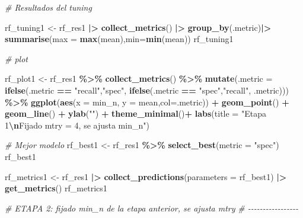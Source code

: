 \documentclass[12pt,a4paper,]{book}
\newenvironment{Shaded}{\begin{snugshade}}{\end{snugshade}}
\newcommand{\AttributeTok}[1]{\textcolor[rgb]{0.13,0.29,0.53}{#1}}
\newcommand{\CommentTok}[1]{\textcolor[rgb]{0.56,0.35,0.01}{\textit{#1}}}
\newcommand{\FunctionTok}[1]{\textcolor[rgb]{0.13,0.29,0.53}{\textbf{#1}}}
\newcommand{\NormalTok}[1]{#1}
\newcommand{\OtherTok}[1]{\textcolor[rgb]{0.56,0.35,0.01}{#1}}
\newcommand{\SpecialCharTok}[1]{\textcolor[rgb]{0.81,0.36,0.00}{\textbf{#1}}}
\newcommand{\StringTok}[1]{\textcolor[rgb]{0.31,0.60,0.02}{#1}}
\numberwithin{dummy}{section}
\theoremstyle{ocrenumbox}
\theoremstyle{blacknumex}
\theoremstyle{blacknumbox}
\theoremstyle{ocrenum}
\theoremstyle{ocrenum}
\begin{document}
\begin{Shaded}
\begin{Highlighting}[]
\CommentTok{\# Resultados del tuning}

\NormalTok{rf\_tuning1 }\OtherTok{\textless{}{-}}\NormalTok{ rf\_res1 }\SpecialCharTok{|\textgreater{}} 
  \FunctionTok{collect\_metrics}\NormalTok{() }\SpecialCharTok{|\textgreater{}} 
  \FunctionTok{group\_by}\NormalTok{(.metric)}\SpecialCharTok{|\textgreater{}} 
  \FunctionTok{summarise}\NormalTok{(}\AttributeTok{max =} \FunctionTok{max}\NormalTok{(mean),}\AttributeTok{min=}\FunctionTok{min}\NormalTok{(mean))}
\NormalTok{rf\_tuning1}

\CommentTok{\# plot}

\NormalTok{rf\_plot1 }\OtherTok{\textless{}{-}} 
\NormalTok{  rf\_res1 }\SpecialCharTok{\%\textgreater{}\%} 
  \FunctionTok{collect\_metrics}\NormalTok{() }\SpecialCharTok{\%\textgreater{}\%}  
  \FunctionTok{mutate}\NormalTok{(}\AttributeTok{.metric =} \FunctionTok{ifelse}\NormalTok{(.metric }\SpecialCharTok{==} \StringTok{"recall"}\NormalTok{,}\StringTok{"spec"}\NormalTok{,}
                          \FunctionTok{ifelse}\NormalTok{(.metric }\SpecialCharTok{==} \StringTok{"spec"}\NormalTok{,}\StringTok{"recall"}\NormalTok{,}
\NormalTok{                                 .metric))) }\SpecialCharTok{\%\textgreater{}\%} 
  \FunctionTok{ggplot}\NormalTok{(}\FunctionTok{aes}\NormalTok{(}\AttributeTok{x =}\NormalTok{ min\_n, }\AttributeTok{y =}\NormalTok{ mean,}\AttributeTok{col=}\NormalTok{.metric)) }\SpecialCharTok{+} 
  \FunctionTok{geom\_point}\NormalTok{() }\SpecialCharTok{+} 
  \FunctionTok{geom\_line}\NormalTok{() }\SpecialCharTok{+} 
  \FunctionTok{ylab}\NormalTok{(}\StringTok{""}\NormalTok{) }\SpecialCharTok{+}
  \FunctionTok{theme\_minimal}\NormalTok{()}\SpecialCharTok{+}
  \FunctionTok{labs}\NormalTok{(}\AttributeTok{title =} \StringTok{"Etapa 1}\SpecialCharTok{\textbackslash{}n}\StringTok{Fijado mtry = 4, se ajusta min\_n"}\NormalTok{)}


\CommentTok{\# Mejor modelo}
\NormalTok{rf\_best1 }\OtherTok{\textless{}{-}} 
\NormalTok{  rf\_res1 }\SpecialCharTok{\%\textgreater{}\%} 
  \FunctionTok{select\_best}\NormalTok{(}\AttributeTok{metric =} \StringTok{"spec"}\NormalTok{)}
\NormalTok{rf\_best1}

\NormalTok{rf\_metrics1 }\OtherTok{\textless{}{-}}\NormalTok{ rf\_res1 }\SpecialCharTok{|\textgreater{}} 
  \FunctionTok{collect\_predictions}\NormalTok{(}\AttributeTok{parameters =}\NormalTok{ rf\_best1) }\SpecialCharTok{|\textgreater{}} 
  \FunctionTok{get\_metrics}\NormalTok{()}
\NormalTok{rf\_metrics1}


\CommentTok{\# ETAPA 2: fijado min\_n de la etapa anterior, se ajusta mtry}
\CommentTok{\# {-}{-}{-}{-}{-}{-}{-}{-}{-}{-}{-}{-}{-}{-}{-}{-}{-}}


\end{Highlighting}
\end{Shaded}
\end{document}
